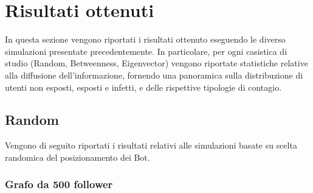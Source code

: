 \section{Risultati ottenuti}
In questa sezione vengono riportati i risultati ottenuto eseguendo le diverso simulazioni presentate precedentemente. In particolare, per ogni casistica di studio (Random, Betweenness, Eigenvector) vengono riportate statistiche relative alla diffusione dell'informazione, fornendo una panoramica sulla distribuzione di utenti non esposti, esposti e infetti, e delle rispettive tipologie di contagio.
    \subsection{Random}
    Vengono di seguito riportati i risultati relativi alle simulazioni basate su scelta randomica del posizionamento dei Bot.
        \subsubsection{Grafo da 500 follower}


